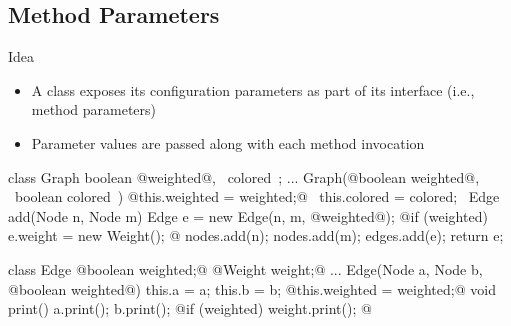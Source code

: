 \subsection{Method Parameters}
\begin{frame}[fragile]{\myframetitle}
	\begin{mycolumns}[t]
		\begin{definition}{Idea}
			\begin{itemize}
				\item A class exposes its configuration parameters as part of its interface (i.e., method parameters)
				\item Parameter values are passed along with each method invocation
			\end{itemize}
		\end{definition}
		\small
\begin{codetight}{}
class Graph {
	boolean @weighted@, ~colored~;
	...
	Graph(@boolean weighted@, ~boolean colored~) {
		@this.weighted = weighted;@ ~this.colored = colored;~
	}
	Edge add(Node n, Node m) {
		Edge e = new Edge(n, m, @weighted@);
		@if (weighted) { e.weight = new Weight(); }@
		nodes.add(n); nodes.add(m); edges.add(e);
		return e;
	}
}
\end{codetight}
	\mynextcolumn
	\small
\begin{codetight}{}
class Edge {
	@boolean weighted;@
	@Weight weight;@
	...
	Edge(Node a, Node b, @boolean weighted@) {
		this.a = a; this.b = b;
		@this.weighted = weighted;@
	}
	void print() {
		a.print(); b.print();
		@if (weighted) { weight.print(); }@
	}
}
\end{codetight}
		\normalsize
	\end{mycolumns}
\end{frame}


